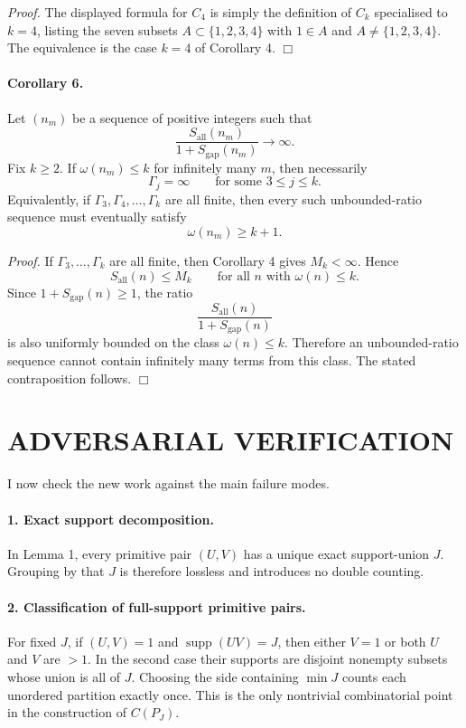 \emph{Proof.}
The displayed formula for \(C_4\) is simply the definition of \(C_k\) specialised to \(k=4\), listing the seven subsets \(A\subset\{1,2,3,4\}\) with \(1\in A\) and \(A\neq \{1,2,3,4\}\).
The equivalence is the case \(k=4\) of Corollary 4.
\hfill\(\Box\)

\paragraph{Corollary 6.}
Let \((n_m)\) be a sequence of positive integers such that
\[
\frac{S_{\mathrm{all}}(n_m)}{1+S_{\mathrm{gap}}(n_m)}\to\infty.
\]
Fix \(k\ge 2\). If \(\omega(n_m)\le k\) for infinitely many \(m\), then necessarily
\[
\Gamma_j=\infty
\qquad\text{for some }3\le j\le k.
\]
Equivalently, if \(\Gamma_3,\Gamma_4,\dots,\Gamma_k\) are all finite, then every such unbounded-ratio sequence must eventually satisfy
\[
\omega(n_m)\ge k+1.
\]

\emph{Proof.}
If \(\Gamma_3,\dots,\Gamma_k\) are all finite, then Corollary 4 gives \(M_k<\infty\). Hence
\[
S_{\mathrm{all}}(n)\le M_k
\qquad\text{for all }n\text{ with }\omega(n)\le k.
\]
Since \(1+S_{\mathrm{gap}}(n)\ge 1\), the ratio
\[
\frac{S_{\mathrm{all}}(n)}{1+S_{\mathrm{gap}}(n)}
\]
is also uniformly bounded on the class \(\omega(n)\le k\). Therefore an unbounded-ratio sequence cannot contain infinitely many terms from this class. The stated contraposition follows.
\hfill\(\Box\)

\section{ADVERSARIAL VERIFICATION}

I now check the new work against the main failure modes.

\paragraph{1. Exact support decomposition.}
In Lemma 1, every primitive pair \((U,V)\) has a unique exact support-union \(J\). Grouping by that \(J\) is therefore lossless and introduces no double counting.

\paragraph{2. Classification of full-support primitive pairs.}
For fixed \(J\), if \((U,V)=1\) and \(\operatorname{supp}(UV)=J\), then either \(V=1\) or both \(U\) and \(V\) are \(>1\). In the second case their supports are disjoint nonempty subsets whose union is all of \(J\). Choosing the side containing \(\min J\) counts each unordered partition exactly once. This is the only nontrivial combinatorial point in the construction of \(C(P_J)\).

